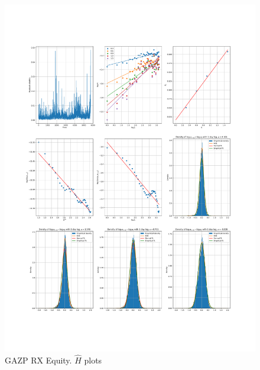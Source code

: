    \begin{figure}[h]
        \centering
        \includegraphics[width=\textwidth]{fig/GAZP RX Equity.pdf}
        \caption{GAZP RX Equity. $\hat{H}$ plots}
    \end{figure} 
        

